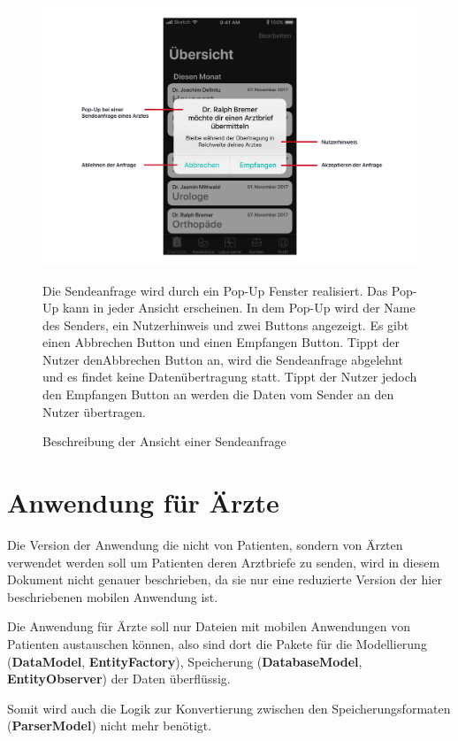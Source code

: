 \documentclass[a4paper]{scrreprt}
\begin{document}
\begin{figure}
\includegraphics[width=1\textwidth]{graphics/UIDescriptions/PopUpDesc}
\caption{Beschreibung der Ansicht einer Sendeanfrage}
\vspace{0.5cm}
Die Sendeanfrage wird durch ein Pop-Up Fenster realisiert. Das Pop-Up kann in jeder Ansicht erscheinen. In dem Pop-Up wird der Name des Senders, ein Nutzerhinweis und zwei Buttons angezeigt. Es gibt einen \dq Abbrechen\dq{} Button und einen \dq Empfangen\dq{} Button. Tippt der Nutzer den\dq Abbrechen\dq{} Button an, wird die Sendeanfrage abgelehnt und es findet keine Datenübertragung statt. Tippt der Nutzer jedoch den \dq Empfangen\dq{} Button an werden die Daten vom Sender an den Nutzer übertragen.
\end{figure}

\chapter{Anwendung für Ärzte}
Die Version der Anwendung die nicht von Patienten, sondern von Ärzten verwendet werden soll um Patienten deren Arztbriefe zu senden, wird in diesem Dokument nicht genauer beschrieben, da sie nur eine reduzierte Version der hier beschriebenen mobilen Anwendung ist. 

Die Anwendung für Ärzte soll nur Dateien mit mobilen Anwendungen von Patienten austauschen können, also
sind dort die Pakete für die Modellierung (\textbf{DataModel}, \textbf{EntityFactory}), Speicherung (\textbf{DatabaseModel}, \textbf{EntityObserver}) der Daten überflüssig. 

Somit wird auch die Logik zur Konvertierung zwischen den Speicherungsformaten (\textbf{ParserModel}) nicht mehr benötigt. 
\end{document}
